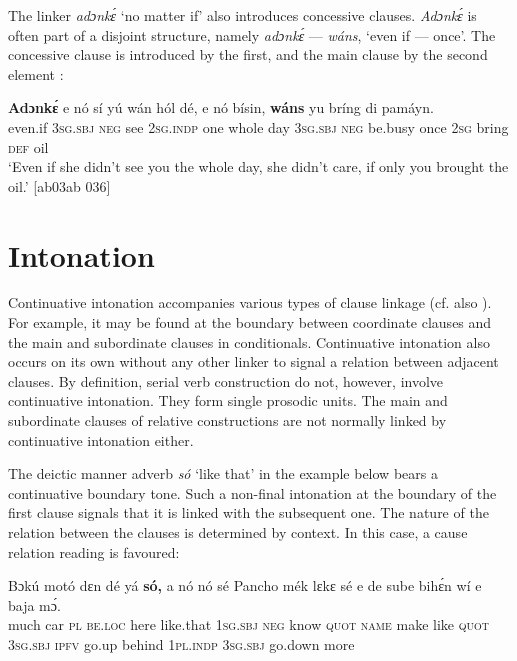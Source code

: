 The linker \textit{adɔnkɛ́} ‘no matter if’ also introduces concessive clauses. \textit{Adɔnkɛ́} is often part of a disjoint structure, namely \textit{adɔnkɛ́} — \textit{wáns}, ‘even if — once’. The concessive clause is introduced by the first, and the main clause by the second element : 


\ea%
    \label{ex:key:1537}
    \gll \textbf{Adɔnkɛ́}  e    nó  sí  yú    wán  hól    dé,  e    nó  bísin,
\textbf{wáns}  yu  bríng  di  pamáyn.\\
even.if  \textsc{3sg.sbj}  \textsc{neg}  see  \textsc{2sg.indp}  one  whole  day  \textsc{3sg.sbj}  \textsc{neg}  be.busy
once  \textsc{2sg}  bring  \textsc{def}  oil\\

\glt ‘Even if she didn’t see you the whole day, she didn’t care, if only you 
brought the oil.’ [ab03ab 036]
\z

\section{Intonation}\label{sec:10.8}

Continuative intonation accompanies various types of clause linkage (cf. also ). For example, it may be found at the boundary between coordinate clauses and the main and subordinate clauses in conditionals. Continuative intonation also occurs on its own without any other linker to signal a relation between adjacent clauses. By definition, serial verb construction do not, however, involve continuative intonation. They form single prosodic units. The main and subordinate clauses of relative constructions are not normally linked by continuative intonation either.


The deictic manner adverb \textit{só} ‘like that’ in the example below bears a continuative boundary tone. Such a non-final intonation at the boundary of the first clause signals that it is linked with the subsequent one. The nature of the relation between the clauses is determined by context. In this case, a cause relation reading is favoured:



\ea%
    \label{ex:key:1538}
    \gll Bɔkú  motó  dɛn  dé    yá    \textbf{só,}    a    nó  nó    sé
Pancho  mék    lɛkɛ    sé    e    de  sube    bihɛ́n
wí    e    baja      mɔ́.\\
much  car    \textsc{pl}  \textsc{be.loc}  here    like.that  \textsc{1sg.sbj}  \textsc{neg}  know  \textsc{quot}
\textsc{name}  make  like    \textsc{quot}    \textsc{3sg.sbj}  \textsc{ipfv}  go.up  behind
\textsc{1pl.indp}  \textsc{3sg.sbj}  go.down    more\\

